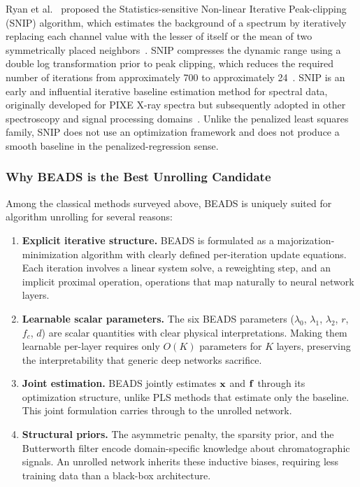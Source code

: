 Ryan et al.~\cite{ryan1988snip} proposed the Statistics-sensitive Non-linear Iterative Peak-clipping (SNIP) algorithm, which estimates the background of a spectrum by iteratively replacing each channel value with the lesser of itself or the mean of two symmetrically placed neighbors~\cite{ryan1988snip}. SNIP compresses the dynamic range using a double log transformation prior to peak clipping, which reduces the required number of iterations from approximately 700 to approximately 24~\cite{ryan1988snip}. SNIP is an early and influential iterative baseline estimation method for spectral data, originally developed for PIXE X-ray spectra but subsequently adopted in other spectroscopy and signal processing domains~\cite{ryan1988snip}. Unlike the penalized least squares family, SNIP does not use an optimization framework and does not produce a smooth baseline in the penalized-regression sense.

\subsubsection{Why BEADS is the Best Unrolling Candidate}

Among the classical methods surveyed above, BEADS is uniquely suited for algorithm unrolling for several reasons:

\begin{enumerate}
    \item \textbf{Explicit iterative structure.} BEADS is formulated as a majorization-minimization algorithm with clearly defined per-iteration update equations. Each iteration involves a linear system solve, a reweighting step, and an implicit proximal operation, operations that map naturally to neural network layers.

    \item \textbf{Learnable scalar parameters.} The six BEADS parameters ($\lambda_0$, $\lambda_1$, $\lambda_2$, $r$, $f_c$, $d$) are scalar quantities with clear physical interpretations. Making them learnable per-layer requires only $O(K)$ parameters for $K$ layers, preserving the interpretability that generic deep networks sacrifice.

    \item \textbf{Joint estimation.} BEADS jointly estimates $\mathbf{x}$ and $\mathbf{f}$ through its optimization structure, unlike PLS methods that estimate only the baseline. This joint formulation carries through to the unrolled network.

    \item \textbf{Structural priors.} The asymmetric penalty, the sparsity prior, and the Butterworth filter encode domain-specific knowledge about chromatographic signals. An unrolled network inherits these inductive biases, requiring less training data than a black-box architecture.
\end{enumerate}

